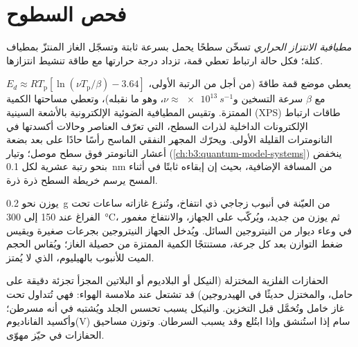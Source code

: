 \section{فحص السطوح}

\begin{definition}\label{def:b3:surfaces-catalysis:tpd}
\emph{مطيافية الانتزاز الحراري}
تسخّن سطحًا يحمل  بسرعة ثابتة وتسجّل
الغاز المنتزّ بمطياف كتلة؛ فكل حالة ارتباط تعطي قمة، تزداد
درجة حرارتها مع طاقة تنشيط انتزازها.
\end{definition}

يعطي موضع قمة  طاقةَ  (من أجل  من الرتبة
الأولى، $E_d \approx RT_{\mathrm p}[\ln(\nu T_{\mathrm p}/\beta) - 3.64]$ مع $\beta$ سرعة التسخين و$\nu \approx \qty{e13}{s^{-1}}$،
وهو ما نقبله)، وتعطي مساحتها الكمية الممتزة. وتقيس المطيافية الضوئية الإلكترونية بالأشعة
السينية (XPS) طاقات ارتباط الإلكترونات الداخلية لذرات السطح،
التي تعرّف العناصر وحالات أكسدتها في النانومترات القليلة
الأولى. ويحرّك المجهر النفقي الماسح رأسًا حادًا على بعد بضعة أعشار
النانومتر فوق سطح موصل؛ وتيار 
(\cref{ch:b3:quantum-model-systems}) ينخفض بنحو رتبة عشرية لكل
\qty{0.1}{nm} من المسافة الإضافية، بحيث إن إبقاءه ثابتًا في أثناء المسح
يرسم خريطة السطح ذرة ذرة.

\begin{inthelab}
يوزن نحو \qty{0.2}{g} من العيّنة في أنبوب زجاجي ذي انتفاخ، وتُنزع غازاته
ساعات تحت الفراغ عند 150 إلى \qty{300}{\celsius}، ثم يوزن من جديد، ويُركّب على
الجهاز، والانتفاخ مغمور في وعاء ديوار من النيتروجين السائل. ويُدخل الجهاز
النيتروجين بجرعات صغيرة ويقيس ضغط التوازن بعد كل جرعة،
مستنتجًا الكمية الممتزة من حصيلة الغاز؛ ويُقاس الحجم الميت للأنبوب
بالهيليوم، الذي لا يُمتز.
\end{inthelab}

\begin{safety}{}
الحفازات الفلزية المختزلة (النيكل أو البلاديوم أو البلاتين المجزأ تجزئة دقيقة على
حامل، والمختزل حديثًا في الهيدروجين) قد تشتعل عند ملامسة الهواء: فهي
تُتداول تحت غاز خامل وتُخمَّل قبل التخزين. والنيكل يسبب
تحسس الجلد ويُشتبه في أنه مسرطن؛ وأكسيد الفاناديوم(V) سام إذا استُنشق
وإذا ابتُلع وقد يسبب السرطان. وتوزن مساحيق الحفازات في
حيّز مهوّى.
\end{safety}

